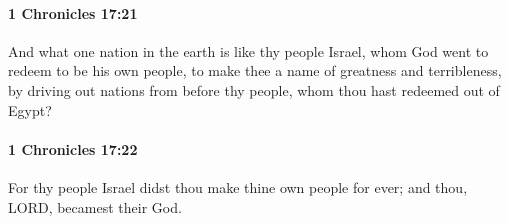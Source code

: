 		\paragraph{1 Chronicles 17:21} %
			\label{1CHRONICLES-17-21}

			And what one nation in the earth is like thy people Israel, whom God went to redeem to be his own people, to make thee a name of greatness and terribleness, by driving out nations from before thy people, whom thou hast redeemed out of Egypt?


		\paragraph{1 Chronicles 17:22} %
			\label{1CHRONICLES-17-22}

			For thy people Israel didst thou make thine own people for ever; and thou, LORD, becamest their God.

